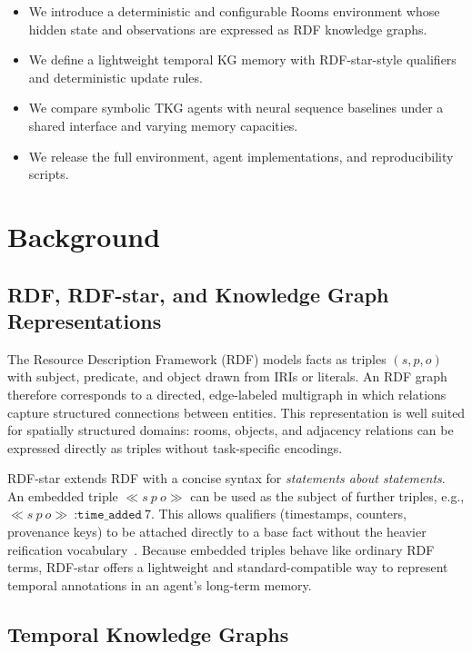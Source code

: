 \documentclass[runningheads]{llncs}
\begin{document}
\begin{itemize}
    \item We introduce a deterministic and configurable Rooms environment
    whose hidden state and observations are expressed as RDF knowledge graphs.
    \item We define a lightweight temporal KG memory with RDF-star-style
    qualifiers and deterministic update rules.
    \item We compare symbolic TKG agents with neural sequence baselines
    under a shared interface and varying memory capacities.
    \item We release the full environment, agent implementations, and
    reproducibility scripts.
\end{itemize}


\section{Background}

\subsection{RDF, RDF-star, and Knowledge Graph Representations}

The Resource Description Framework (RDF) models facts as triples
$(s,p,o)$ with subject, predicate, and object drawn from IRIs or
literals. An RDF graph therefore corresponds to a directed,
edge-labeled multigraph in which relations capture structured
connections between entities. This representation is well suited for
spatially structured domains: rooms, objects, and adjacency relations
can be expressed directly as triples without task-specific encodings.

RDF-star extends RDF with a concise syntax for \emph{statements about
statements}. An embedded triple $\ll s\ p\ o\gg$ can be used as the
subject of further triples, e.g.,
$\ll s\ p\ o\gg\ \texttt{:time\_added}\ 7$. This allows qualifiers
(timestamps, counters, provenance keys) to be attached directly to a
base fact without the heavier reification vocabulary~\cite{hartig2021foundationsalternativeapproachreification}. Because embedded
triples behave like ordinary RDF terms, RDF-star offers a lightweight
and standard-compatible way to represent temporal annotations in an
agent’s long-term memory.


\subsection{Temporal Knowledge Graphs}
\end{document}
